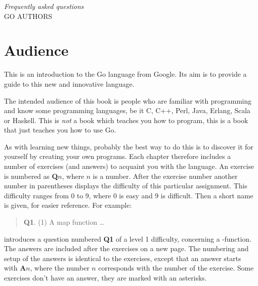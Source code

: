{\textit{Frequently asked questions}\\ \textsc{GO AUTHORS}}

\section*{Audience}
\noindent{}This is an introduction to the Go language from Google. Its aim
is to provide a guide to this new and innovative language. 

The intended audience of this book is people who are familiar with programming
and know some programming languages, be it C\cite{c}, C++\cite{c++}, 
Perl\cite{perl}, Java\cite{java}, Erlang\cite{erlang}, Scala\cite{scala} or
Haskell\cite{haskell}. This is \emph{not} a book which teaches you how to 
program, this is a book that just teaches you how to use Go.

As with
learning new things, probably the best way to do this is to discover it for
yourself by creating your own programs.
Each chapter therefore includes a number of exercises (and answers)
to acquaint you with the language.
An exercise
is numbered as \textbf{Q$n$}, where $n$ is a number. After the
exercise number another number in parentheses displays the difficulty
of this particular assignment. This difficulty ranges from 0 to
9, where 0 is easy and 9 is difficult. 
Then a short name is given, for easier reference.
For example:
\begin{verse}
\textbf{Q1}. (1) A map function \ldots
\end{verse}
introduces a question numbered \textbf{Q1} of a level 1 difficulty, concerning a
-function. The answers are included after the exercises on a
new page.
The numbering and setup of the answers is identical to the
exercises, except that an answer starts with \textbf{A$n$}, where the
number $n$ corresponds with the number of the exercise. Some exercises
don't have an answer, they are marked with an asterisks.

